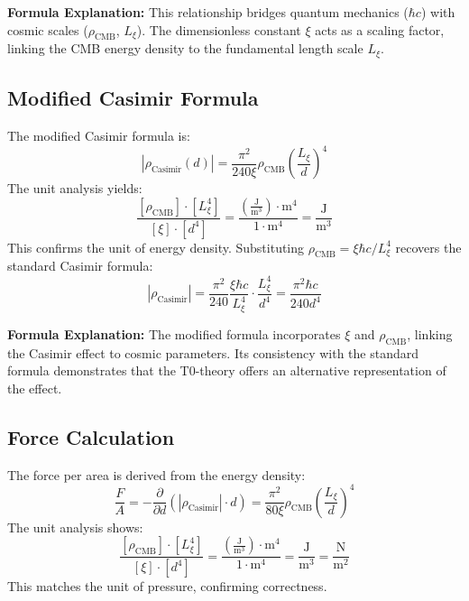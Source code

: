 	\textbf{Formula Explanation:} This relationship bridges quantum mechanics ($\hbar c$) with cosmic scales ($\rho_{\text{CMB}}$, $L_\xi$). The dimensionless constant $\xi$ acts as a scaling factor, linking the CMB energy density to the fundamental length scale $L_\xi$.
	
	\subsection{Modified Casimir Formula}
	The modified Casimir formula is:
	\begin{equation}
		|\rho_{\text{Casimir}}(d)| = \frac{\pi^2}{240 \xi} \rho_{\text{CMB}} \left( \frac{L_\xi}{d} \right)^4
	\end{equation}
	The unit analysis yields:
	\begin{equation}
		\frac{[\rho_{\text{CMB}}] \cdot [L_\xi^4]}{[\xi] \cdot [d^4]} = \frac{\left( \frac{\text{J}}{\text{m}^3} \right) \cdot \text{m}^4}{1 \cdot \text{m}^4} = \frac{\text{J}}{\text{m}^3}
	\end{equation}
	This confirms the unit of energy density. Substituting $\rho_{\text{CMB}} = \xi \hbar c / L_\xi^4$ recovers the standard Casimir formula:
	\begin{equation}
		|\rho_{\text{Casimir}}| = \frac{\pi^2}{240} \frac{\xi \hbar c}{L_\xi^4} \cdot \frac{L_\xi^4}{d^4} = \frac{\pi^2 \hbar c}{240 d^4}
	\end{equation}
	
	\textbf{Formula Explanation:} The modified formula incorporates $\xi$ and $\rho_{\text{CMB}}$, linking the Casimir effect to cosmic parameters. Its consistency with the standard formula demonstrates that the T0-theory offers an alternative representation of the effect.
	
	\subsection{Force Calculation}
	The force per area is derived from the energy density:
	\begin{equation}
		\frac{F}{A} = -\frac{\partial}{\partial d} \left( |\rho_{\text{Casimir}}| \cdot d \right) = \frac{\pi^2}{80 \xi} \rho_{\text{CMB}} \left( \frac{L_\xi}{d} \right)^4
	\end{equation}
	The unit analysis shows:
	\begin{equation}
		\frac{[\rho_{\text{CMB}}] \cdot [L_\xi^4]}{[\xi] \cdot [d^4]} = \frac{\left( \frac{\text{J}}{\text{m}^3} \right) \cdot \text{m}^4}{1 \cdot \text{m}^4} = \frac{\text{J}}{\text{m}^3} = \frac{\text{N}}{\text{m}^2}
	\end{equation}
	This matches the unit of pressure, confirming correctness.
	
